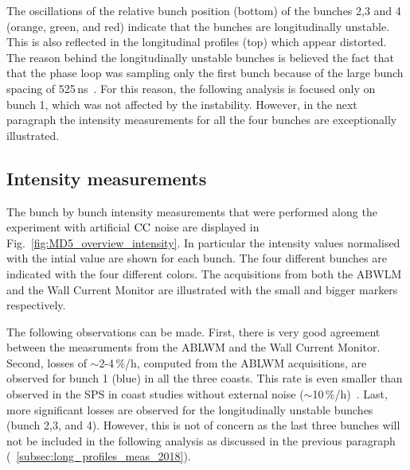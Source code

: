 
The oscillations of the relative bunch position (bottom) of the bunches 2,3 and 4 (orange, green, and red) indicate that the bunches are longitudinally unstable. This is also reflected in the longitudinal profiles (top) which appear distorted. The reason behind the longitudinally unstable bunches is believed the fact that that the phase loop was sampling only the first bunch
because of the large bunch spacing of 525\,ns~\cite{Argyropoulos_unstable_bunches_2018}. For this reason, the following analysis is focused only on bunch 1, which was not affected by the instability. However, in the next paragraph the intensity measurements for all the four bunches are exceptionally illustrated.

\subsection{Intensity measurements}\label{subsec:intensity_2018_meas}
The bunch by bunch intensity measurements that were performed along the experiment with artificial ${\mathrm{CC}}$ noise are displayed in Fig.~\ref{fig:MD5_overview_intensity}. In particular the intensity values normalised with the intial value are shown for each bunch. The four different bunches are indicated with the four different colors. The acquisitions from both the ABWLM and the Wall Current Monitor are illustrated with the small and bigger markers respectively.

The following observations can be made. First, there is very good agreement between the measruments from the ABLWM and the Wall Current Monitor. Second, losses of $\sim$2-4\,$\%$/h, computed from the ABLWM acquisitions, are observed for bunch 1 (blue) in all the three coasts. This rate is even smaller than observed in the SPS in coast studies without external noise ($\sim$10\,$\%$/h)~\cite{Alekou_CC_coast_prep_2016}. Last, more significant losses are observed for the longitudinally unstable bunches (bunch 2,3, and 4). However, this is not of concern as the last three bunches will not be included in the following analysis as discussed in the previous paragraph (~\ref{subsec:long_profiles_meas_2018}).

